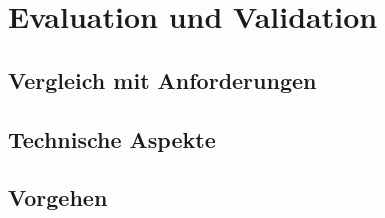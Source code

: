 \chapter{Evaluation und Validation}
\label{ch:Eval}

\section{Vergleich mit Anforderungen}
\label{sec:VergleichAnforderungen}

\section{Technische Aspekte}

\section{Vorgehen}
